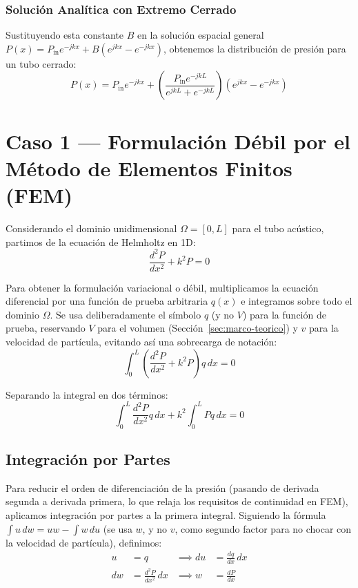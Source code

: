 \documentclass[11pt,letterpaper]{article}
\begin{document}
\subsubsection{Solución Analítica con Extremo Cerrado}
Sustituyendo esta constante $B$ en la solución espacial general $P(x) = P_{\text{in}} e^{-jkx} + B(e^{jkx} - e^{-jkx})$, obtenemos la distribución de presión para un tubo cerrado:
\begin{equation}
    P(x) = P_{\text{in}} e^{-jkx} + \left( \frac{P_{\text{in}} e^{-jkL}}{e^{jkL} + e^{-jkL}} \right) (e^{jkx} - e^{-jkx})
\end{equation}

\section{Caso 1 --- Formulación Débil por el Método de Elementos Finitos (FEM)}

Considerando el dominio unidimensional $\Omega = [0, L]$ para el tubo acústico, partimos de la ecuación de Helmholtz en 1D:
\begin{equation}
    \frac{d^2 P}{dx^2} + k^2 P = 0
\end{equation}

Para obtener la formulación variacional o débil, multiplicamos la ecuación diferencial por una función de prueba arbitraria $q(x)$ e integramos sobre todo el dominio $\Omega$. Se usa deliberadamente el símbolo $q$ (y no $V$) para la función de prueba, reservando $V$ para el volumen (Sección~\ref{sec:marco-teorico}) y $v$ para la velocidad de partícula, evitando así una sobrecarga de notación:
\begin{equation}
    \int_0^L \left( \frac{d^2 P}{dx^2} + k^2 P \right) q \, dx = 0
\end{equation}

Separando la integral en dos términos:
\begin{equation}
    \int_0^L \frac{d^2 P}{dx^2} q \, dx + k^2 \int_0^L P q \, dx = 0
\end{equation}

\subsection{Integración por Partes}
Para reducir el orden de diferenciación de la presión (pasando de derivada segunda a derivada primera, lo que relaja los requisitos de continuidad en FEM), aplicamos integración por partes a la primera integral. Siguiendo la fórmula $\int u\,dw = uw - \int w\,du$ (se usa $w$, y no $v$, como segundo factor para no chocar con la velocidad de partícula), definimos:
\begin{align*}
    u &= q &\implies du &= \frac{dq}{dx} \, dx \\
    dw &= \frac{d^2 P}{dx^2} \, dx &\implies w &= \frac{dP}{dx}
\end{align*}
\end{document}
